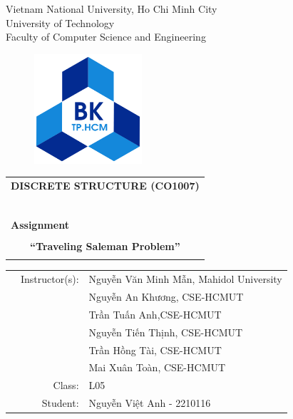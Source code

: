 \documentclass[a4paper]{article}
\begin{document}
\begin{titlepage}
\begin{center}
\Large Vietnam National University, Ho Chi Minh City \\
\Large University of Technology \\
\Large Faculty of Computer Science and Engineering 
\end{center}

\vspace{1cm}

\begin{figure}[h!]
\begin{center}
\includegraphics[width=4cm]{hcmut.png}
\end{center}
\end{figure}

\vspace{1cm}

\begin{center}
\begin{tabular}{c}
    \multicolumn{1}{l}{\textbf{{\Large DISCRETE STRUCTURE
(CO1007)}}}\\
    ~~\\
    \hline
    \\
    \multicolumn{1}{l}{\textbf{{\Large Assignment }}}\\
    \\
        \textbf{{\LARGE “Traveling Saleman Problem”}}\\
    \\
    \hline
\end{tabular}
\end{center}
\vspace{2cm}

\begin{table}[h]
\begin{tabular}{rrl}
\hspace{3 cm} 
& Instructor(s): & Nguyễn Văn Minh Mẫn, Mahidol University \\
& &  Nguyễn An Khương, CSE-HCMUT \\
& &  Trần Tuấn Anh,CSE-HCMUT \\
& &  Nguyễn Tiến Thịnh, CSE-HCMUT \\
& &  Trần Hồng Tài, CSE-HCMUT \\
& &  Mai Xuân Toàn, CSE-HCMUT \\
& Class: &L05\\
& Student: & Nguyễn Việt Anh - 2210116\\
\end{tabular}
\end{table}
\vspace{1cm}
\begin{center}
\date{\footnotesize\today}
\end{center}
\end{titlepage}
\end{document}
